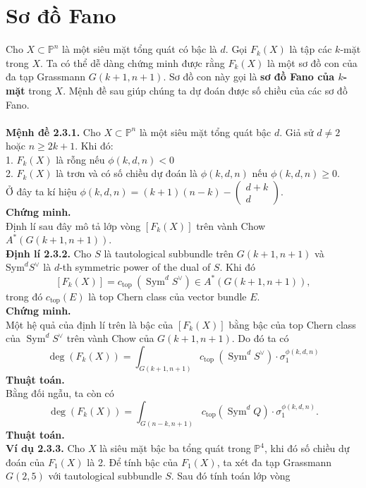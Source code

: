 \documentclass[11pt,a4paper]{book}
\begin{document}
\section{Sơ đồ Fano}

Cho $X \subset \mathbb{P}^n$ là một siêu mặt tổng quát có bậc là $d$. Gọi $F_k(X)$ là tập các  $k$-mặt trong $X$. Ta có thể dễ dàng chứng minh được rằng $F_k(X)$ là một sơ đồ con của đa tạp Grassmann $G(k+1, n+1)$. Sơ đồ con này gọi là \textbf{sơ đồ Fano của $k$-mặt} trong $X$. Mệnh đề sau giúp chúng ta dự đoán được số chiều của các sơ đồ Fano.\\\\
\textbf{Mệnh đề 2.3.1.} Cho $X \subset \mathbb{P}^n$ là một siêu mặt tổng quát bậc $d$. Giả sử $d \neq 2$ hoặc $n \geq 2 k+1$. Khi đó:\\
1. $F_k(X)$ là rỗng nếu $\phi(k, d, n)<0$\\
2. $F_k(X)$ là trơn và có số chiều dự đoán là $\phi(k, d, n)$ nếu $\phi(k, d, n) \geq 0$.\\
Ở đây ta kí hiệu $\phi(k, d, n)=(k+1)(n-k)-\begin{pmatrix}
d+k\\
d
\end{pmatrix}$.\\
\textbf{Chứng minh.}\\
Định lí sau đây mô tả lớp vòng $\left[F_k(X)\right]$ trên vành Chow $A^*(G(k+1, n+1))$.\\
\textbf{Định lí 2.3.2.} Cho $S$ là tautological subbundle trên $G(k+1, n+1)$ và $\text{Sym}^d S^{\vee}$ là $d$-th symmetric power of the dual of $S$. Khi đó
$$\left[F_k(X)\right]=c_{\text{top }}\left(\operatorname{Sym}^d S^{\vee}\right) \in A^*(G(k+1, n+1)),$$
trong đó $c_{\text {top}}(E)$ là top Chern class của vector bundle $E$.\\
\textbf{Chứng minh.}\\
Một hệ quả của định lí trên là bậc của $\left[F_k(X)\right]$ bằng bậc của  top Chern class của $\operatorname{Sym}^d S^{\vee}$ trên vành Chow của $G(k+1, n+1)$. Do đó ta có
$$\operatorname{deg}\left(F_k(X)\right)=\int_{G(k+1, n+1)} c_{\text {top }}\left(\operatorname{Sym}^d S^{\vee}\right) \cdot \sigma_1^{\phi(k, d, n)}$$
\textbf{Thuật toán.}\\
Bằng đối ngẫu, ta còn có
$$\operatorname{deg}\left(F_k(X)\right)=\int_{G(n-k, n+1)} c_{\mathrm{top}}\left(\operatorname{Sym}^d Q\right) \cdot \sigma_1^{\phi(k, d, n)} .$$
\textbf{Thuật toán.}\\
\textbf{Ví dụ 2.3.3.} Cho $X$ là siêu mặt bậc ba tổng quát trong $\mathbb{P}^4$, khi đó số chiều dự đoán của $F_1(X)$ là 2. Để tính bậc của $F_1(X)$, ta xét đa tạp Grassmann $G(2,5)$ với tautological subbundle $S$. Sau đó tính toán lớp vòng
\end{document}
